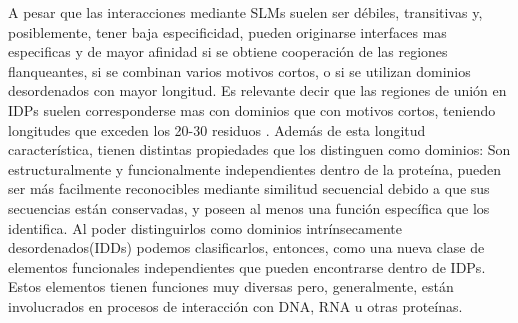 A pesar que las interacciones mediante SLMs suelen ser débiles, transitivas y, posiblemente, tener baja especificidad, pueden originarse interfaces mas especificas y de mayor afinidad si 
se obtiene cooperación de las regiones flanqueantes, si se combinan varios motivos cortos, o si se utilizan dominios desordenados con mayor longitud.
Es relevante decir que las regiones de unión en IDPs suelen corresponderse mas con dominios que con motivos cortos, teniendo longitudes que exceden los 20-30 residuos
\cite{tompa2009close,chen2006conservation,chen2006conservationB}.  
Además de esta longitud característica, tienen distintas propiedades que los distinguen como dominios:
Son estructuralmente y funcionalmente independientes dentro de la proteína, pueden ser más facilmente reconocibles mediante similitud secuencial debido a que sus secuencias están conservadas, 
y poseen al menos una función específica que los identifica.
Al poder distinguirlos como dominios intrínsecamente desordenados(IDDs) podemos clasificarlos, entonces, como una nueva clase de elementos funcionales independientes que pueden encontrarse dentro de IDPs.
Estos elementos tienen funciones muy diversas pero, generalmente, están involucrados en procesos de interacción con DNA, RNA u otras proteínas.









% 






